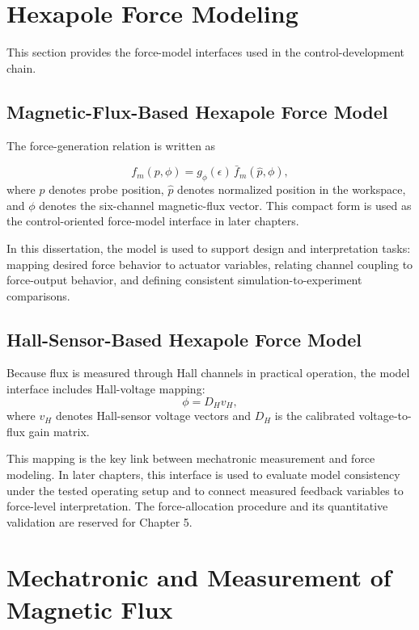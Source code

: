 \section{Hexapole Force Modeling}

This section provides the force-model interfaces used in the control-development chain.

\subsection{Magnetic-Flux-Based Hexapole Force Model}

The force-generation relation is written as

\begin{equation}
f_{m}(p,\phi) = g_{\phi}(\epsilon)\,\bar{f}_{m}(\hat{p},\phi),
\end{equation}
where $p$ denotes probe position, $\hat{p}$ denotes normalized position in the workspace, and $\phi$ denotes the six-channel magnetic-flux vector. This compact form is used as the control-oriented force-model interface in later chapters.

In this dissertation, the model is used to support design and interpretation tasks: mapping desired force behavior to actuator variables, relating channel coupling to force-output behavior, and defining consistent simulation-to-experiment comparisons.

\subsection{Hall-Sensor-Based Hexapole Force Model}

Because flux is measured through Hall channels in practical operation, the model interface includes Hall-voltage mapping:
\begin{equation}
\phi = D_{H}v_{H},
\end{equation}
where $v_{H}$ denotes Hall-sensor voltage vectors and $D_{H}$ is the calibrated voltage-to-flux gain matrix.

This mapping is the key link between mechatronic measurement and force modeling. In later chapters, this interface is used to evaluate model consistency under the tested operating setup and to connect measured feedback variables to force-level interpretation.
The force-allocation procedure and its quantitative validation are reserved for Chapter 5.

\section{Mechatronic and Measurement of Magnetic Flux}

